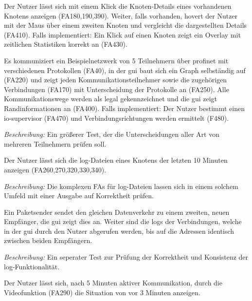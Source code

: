 \begin{description}[style=multiline, leftmargin=4cm, labelwidth=4cm]
  \item[\namedlabel{infobox}{Details anzeigen}] Der Nutzer lässt sich mit einem Klick die Knoten-Details eines vorhandenen Knotens anzeigen (FA180,190,390). Weiter, falls vorhanden, hovert der Nutzer mit der Maus über einem zweiten Knoten und vergleicht die dargestellten Details (FA410). Falls implementiert: Ein Klick auf einen Knoten zeigt ein Overlay mit zeitlichen Statistiken korrekt an (FA430).
  
  \item[\namedlabel{normalWatch}{Normale Netzwerküberwachung}] Es kommuniziert ein Beispielnetzwerk von 5 Teilnehmern über \gls{profinet} mit verschiedenen Protokollen (FA40), in der \gls{gui} baut sich ein Graph selbständig auf (FA220) und zeigt jeden Kommunikationsteilnehmer sowie die zugehörigen Verbindungen (FA170) mit Unterscheidung der Protokolle an (FA250). Alle Kommunikationswege werden als legal gekennzeichnet und die \gls{gui} zeigt Randinformationen an (FA400). Falls implementiert: Der Nutzer bestimmt einen \gls{io-supervisor} (FA470) und Verbindungsrichtungen werden ermittelt (F480). \par
      \textit{Beschreibung:} Ein größerer Test, der die Unterscheidungen aller Art von mehreren Teilnehmern prüfen soll.
  
  \item[\namedlabel{logs}{Log-Dateien anzeigen}] Der Nutzer lässt sich die \gls{log}-Dateien eines Knotens der letzten 10 Minuten anzeigen (FA260,270,320,330,340). \par
      \textit{Beschreibung:} Die komplexen FAs für \gls{log}-Dateien lassen sich in einem solchem Umfeld mit einer Ausgabe auf Korrektheit prüfen.
  
  \item[\namedlabel{guiDisplay}{Korrekte GUI Darstellung}] Ein Paketsender sendet den gleichen Datenverkehr zu einem zweiten, neuen Empfänger, die \gls{gui} zeigt dies an. Weiter sind die \glspl{log} der Verbindungen, welche in der \gls{gui} durch den Nutzer abgerufen werden, bis auf die Adressen identisch zwischen beiden Empfängern. \par
      \textit{Beschreibung:} Ein seperater Test zur Prüfung der Korrektheit und Konsistenz der \gls{log}-Funktionalität.
  
  \item[\namedlabel{video}{Rückverfolgung (optional)}] Der Nutzer lässt sich, nach 5 Minuten aktiver Kommunikation, durch die Videofunktion (FA290) die Situation von vor 3 Minuten anzeigen.
  

\end{description}
